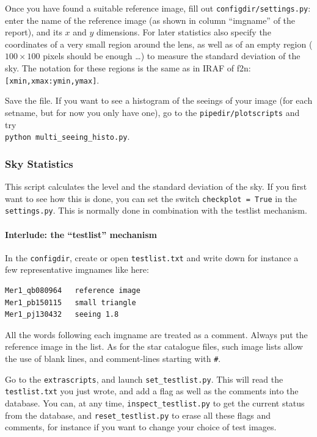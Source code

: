 Once you have found a suitable reference image, fill out \verb+configdir/settings.py+:
enter the name of the reference image (as shown in column ``imgname'' of the report), and its $x$ and $y$ dimensions. For later statistics also specify the coordinates of a very small region around the lens, as well as of an empty region ($100 \times 100$ pixels should be enough \ldots) to measure the standard deviation of the sky. The notation for these regions is the same as in IRAF of f2n:\verb+[xmin,xmax:ymin,ymax]+.

Save the file. If you want to see a histogram of the seeings of your image (for each setname, but for now you only have one), go to the \verb+pipedir/plotscripts+ and try \\
\verb+python multi_seeing_histo.py+.


\subsubsection{Sky Statistics}

This script calculates the level and the standard deviation of the sky. If you first want to see how this is done, you can set the switch \verb+checkplot = True+ in the \verb+settings.py+. This is normally done in combination with the testlist mechanism.

\paragraph{Interlude: the ``testlist'' mechanism}

In the \verb+configdir+, create or open \verb+testlist.txt+ and write down for instance a few representative imgnames like here:

\begin{Verbatim}[fontsize=\relsize{-2}]
Mer1_qb080964	reference image
Mer1_pb150115	small triangle
Mer1_pj130432	seeing 1.8
\end{Verbatim}

All the words following each imgname are treated as a comment. Always put the reference image in the list. As for the star catalogue files, such image lists allow the use of blank lines, and comment-lines starting with \verb+#+.

Go to the \verb+extrascripts+, and launch \verb+set_testlist.py+. This will read the \verb+testlist.txt+ you just wrote, and add a flag as well as the comments into the database. You can, at any time, \verb+inspect_testlist.py+ to get the current status from the database, and \verb+reset_testlist.py+ to erase all these flags and comments, for instance if you want to change your choice of test images.

